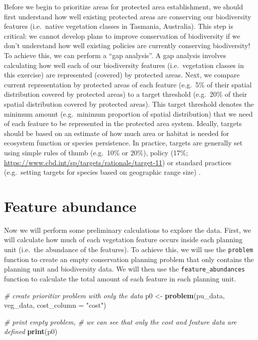 \documentclass[12pt,]{book}
\newenvironment{Shaded}{\begin{snugshade}}{\end{snugshade}}
\newcommand{\KeywordTok}[1]{\textcolor[rgb]{0.13,0.29,0.53}{\textbf{#1}}}
\newcommand{\DataTypeTok}[1]{\textcolor[rgb]{0.13,0.29,0.53}{#1}}
\newcommand{\StringTok}[1]{\textcolor[rgb]{0.31,0.60,0.02}{#1}}
\newcommand{\CommentTok}[1]{\textcolor[rgb]{0.56,0.35,0.01}{\textit{#1}}}
\newcommand{\NormalTok}[1]{#1}
\begin{document}
Before we begin to prioritize areas for protected area establishment, we
should first understand how well existing protected areas are conserving
our biodiversity features (i.e.~native vegetation classes in Tasmania,
Australia). This step is critical: we cannot develop plans to improve
conservation of biodiversity if we don't understand how well existing
policies are currently conserving biodiversity! To achieve this, we can
perform a ``gap analysis''. A gap analysis involves calculating how well
each of our biodiversity features (i.e.~vegetation classes in this
exercise) are represented (covered) by protected areas. Next, we compare
current representation by protected areas of each feature (e.g.~5\% of
their spatial distribution covered by protected areas) to a target
threshold (e.g.~20\% of their spatial distribution covered by protected
areas). This target threshold denotes the minimum amount (e.g.~minimum
proportion of spatial distribution) that we need of each feature to be
represented in the protected area system. Ideally, targets should be
based on an estimate of how much area or habitat is needed for ecosystem
function or species persistence. In practice, targets are generally set
using simple rules of thumb (e.g.~10\% or 20\%), policy (17\%;
\url{https://www.cbd.int/sp/targets/rationale/target-11}) or standard
practices (e.g.~setting targets for species based on geographic range
size) \citep{r1, r2}.

\section{Feature abundance}\label{feature-abundance}

Now we will perform some preliminary calculations to explore the data.
First, we will calculate how much of each vegetation feature occurs
inside each planning unit (i.e.~the abundance of the features). To
achieve this, we will use the \texttt{problem} function to create an
empty conservation planning problem that only contains the planning unit
and biodiversity data. We will then use the \texttt{feature\_abundances}
function to calculate the total amount of each feature in each planning
unit.

\begin{Shaded}
\begin{Highlighting}[]
\CommentTok{# create prioritizr problem with only the data}
\NormalTok{p0 <-}\StringTok{ }\KeywordTok{problem}\NormalTok{(pu_data, veg_data, }\DataTypeTok{cost_column =} \StringTok{"cost"}\NormalTok{)}

\CommentTok{# print empty problem,}
\CommentTok{# we can see that only the cost and feature data are defined}
\KeywordTok{print}\NormalTok{(p0)}
\end{Highlighting}
\end{Shaded}
\end{document}
